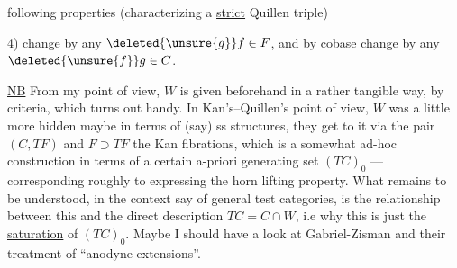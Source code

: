 following properties (characterizing a \uline{strict} Quillen triple)

4)   change by any $\deleted{\unsure{g}}f\in F$, and by cobase change by any $\deleted{\unsure{f}}g\in C$.

 \uline{NB} From my point of view, $W$ is given beforehand in a rather tangible way, by  criteria, which turns out  handy. In Kan's--Quillen's point of view, $W$ was a little more hidden maybe in terms of (say) ss structures, they get to it via  the pair $(C,TF)$ and $F\supset TF$ the Kan fibrations, which is a somewhat ad-hoc construction in terms of a certain  a-priori generating set $(TC)_0$ --- corresponding roughly to expressing the horn lifting property. What remains to be understood, in the context say of general test categories, is the relationship between this and the direct description $TC=C\cap W$,  i.e why this is just the \uline{saturation} of $(TC)_0$. Maybe I should have a look at Gabriel-Zisman and their treatment of ``anodyne extensions''.
